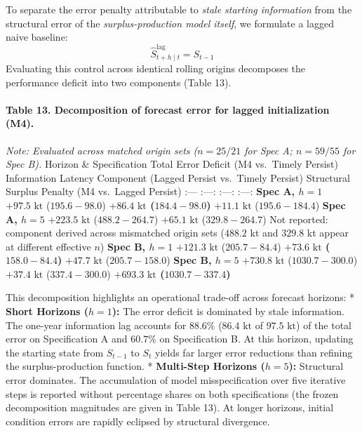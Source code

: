 \documentclass[11pt]{article}
\begin{document}
To separate the error penalty attributable to \emph{stale starting
information} from the structural error of the \emph{surplus-production
model itself}, we formulate a lagged naive baseline:
\[\hat{S}_{t+h \mid t}^{\mathrm{lag}} = S_{t-1}\] Evaluating this
control across identical rolling origins decomposes the performance
deficit into two components (Table 13).

\paragraph{Table 13. Decomposition of forecast error for lagged
initialization
(M4).}\label{table-13.-decomposition-of-forecast-error-for-lagged-initialization-m4.}

\emph{Note: Evaluated across matched origin sets (\(n=25/21\) for Spec
A; \(n=59/55\) for Spec B).} \textbar{} Horizon \& Specification
\textbar{} Total Error Deficit (M4 vs.~Timely Persist) \textbar{}
Information Latency Component (Lagged Persist vs.~Timely Persist)
\textbar{} Structural Surplus Penalty (M4 vs.~Lagged Persist) \textbar{}
\textbar{} :--- \textbar{} :---: \textbar{} :---: \textbar{} :---:
\textbar{} \textbar{} \textbf{Spec A, \(h=1\)} \textbar{}
\(+97.5\text{ kt}\) (\(195.6 - 98.0\)) \textbar{}
\textbf{\(+86.4\text{ kt}\) (\(184.4 - 98.0\))} \textbar{}
\(+11.1\text{ kt}\) (\(195.6 - 184.4\)) \textbar{} \textbar{}
\textbf{Spec A, \(h=5\)} \textbar{} \(+223.5\text{ kt}\)
(\(488.2 - 264.7\)) \textbar{} \(+65.1\text{ kt}\) (\(329.8 - 264.7\))
\textbar{} Not reported: component derived across mismatched origin sets
(\(488.2\) kt and \(329.8\) kt appear at different effective \(n\))
\textbar{} \textbar{} \textbf{Spec B, \(h=1\)} \textbar{}
\(+121.3\text{ kt}\) (\(205.7 - 84.4\)) \textbar{}
\textbf{\(+73.6\text{ kt}\) (\(158.0 - 84.4\))} \textbar{}
\(+47.7\text{ kt}\) (\(205.7 - 158.0\)) \textbar{} \textbar{}
\textbf{Spec B, \(h=5\)} \textbar{} \(+730.8\text{ kt}\)
(\(1030.7 - 300.0\)) \textbar{} \(+37.4\text{ kt}\) (\(337.4 - 300.0\))
\textbar{} \textbf{\(+693.3\text{ kt}\) (\(1030.7 - 337.4\))} \textbar{}

This decomposition highlights an operational trade-off across forecast
horizons: * \textbf{Short Horizons (\(h=1\)):} The error deficit is
dominated by stale information. The one-year information lag accounts
for \(88.6\%\) (\(86.4\text{ kt}\) of \(97.5\text{ kt}\)) of the total
error on Specification A and \(60.7\%\) on Specification B. At this
horizon, updating the starting state from \(S_{t-1}\) to \(S_t\) yields
far larger error reductions than refining the surplus-production
function. * \textbf{Multi-Step Horizons (\(h=5\)):} Structural error
dominates. The accumulation of model misspecification over five
iterative steps is reported without percentage shares on both
specifications (the frozen decomposition magnitudes are given in Table
13). At longer horizons, initial condition errors are rapidly eclipsed
by structural divergence.
\end{document}
